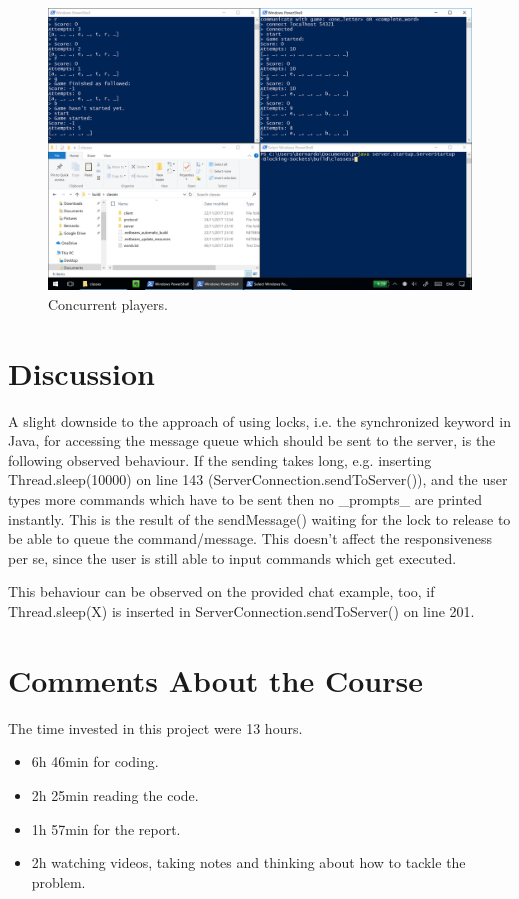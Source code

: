 \documentclass[a4paper]{scrartcl}
\begin{document}
\begin{figure}[h!]
  \begin{center}
    \includegraphics[scale=0.1]{multiple.png}
    \caption{Concurrent players.}
    \label{fig:multiple}
  \end{center}
\end{figure}

\section{Discussion}


A slight downside to the approach of using locks, i.e. the synchronized keyword in Java, for accessing the message queue which should be sent to the server, is the following observed behaviour.
If the sending takes long, e.g. inserting Thread.sleep(10000) on line 143 (ServerConnection.sendToServer()), and the user types more commands which have to be sent then no _prompts_ are printed instantly.
This is the result of the sendMessage() waiting for the lock to release to be able to queue the command/message.
This doesn't affect the responsiveness per se, since the user is still able to input commands which get executed.

This behaviour can be observed on the provided chat example, too, if Thread.sleep(X) is inserted in ServerConnection.sendToServer() on line 201.


\section{Comments About the Course}

The time invested in this project were 13 hours.
\begin{itemize}
        \item 6h 46min for coding.
        \item 2h 25min reading the code.
        \item 1h 57min for the report.
        \item 2h watching videos, taking notes and thinking about how to tackle the problem.
\end{itemize}
\end{document}
